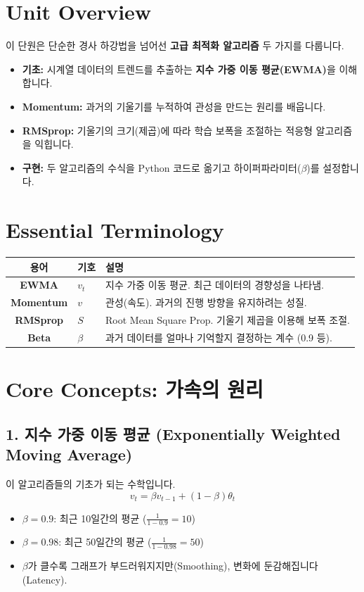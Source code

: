 \documentclass[11pt,a4paper]{book}
\theoremstyle{definition}
\begin{document}
\section{Unit Overview}
\begin{summarybox}[title={핵심 목표}]
이 단원은 단순한 경사 하강법을 넘어선 \textbf{고급 최적화 알고리즘} 두 가지를 다룹니다.
\begin{itemize}
    \item \textbf{기초:} 시계열 데이터의 트렌드를 추출하는 \textbf{지수 가중 이동 평균(EWMA)}을 이해합니다.
    \item \textbf{Momentum:} 과거의 기울기를 누적하여 관성을 만드는 원리를 배웁니다.
    \item \textbf{RMSprop:} 기울기의 크기(제곱)에 따라 학습 보폭을 조절하는 적응형 알고리즘을 익힙니다.
    \item \textbf{구현:} 두 알고리즘의 수식을 Python 코드로 옮기고 하이퍼파라미터($\beta$)를 설정합니다.
\end{itemize}
\end{summarybox}

\section{Essential Terminology}
\begin{center}
\begin{tabular}{|c|l|l|}
\hline
\textbf{용어} & \textbf{기호} & \textbf{설명} \\ \hline
\textbf{EWMA} & $v_t$ & 지수 가중 이동 평균. 최근 데이터의 경향성을 나타냄. \\ \hline
\textbf{Momentum} & $v$ & 관성(속도). 과거의 진행 방향을 유지하려는 성질. \\ \hline
\textbf{RMSprop} & $S$ & Root Mean Square Prop. 기울기 제곱을 이용해 보폭 조절. \\ \hline
\textbf{Beta} & $\beta$ & 과거 데이터를 얼마나 기억할지 결정하는 계수 (0.9 등). \\ \hline
\end{tabular}
\end{center}

\section{Core Concepts: 가속의 원리}

\subsection{1. 지수 가중 이동 평균 (Exponentially Weighted Moving Average)}
이 알고리즘들의 기초가 되는 수학입니다.
$$ v_t = \beta v_{t-1} + (1 - \beta) \theta_t $$
\begin{itemize}
    \item $\beta = 0.9$: 최근 10일간의 평균 ($\frac{1}{1-0.9} = 10$)
    \item $\beta = 0.98$: 최근 50일간의 평균 ($\frac{1}{1-0.98} = 50$)
    \item $\beta$가 클수록 그래프가 부드러워지지만(Smoothing), 변화에 둔감해집니다(Latency).
\end{itemize}
\end{document}
